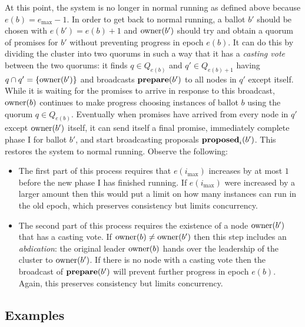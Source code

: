\documentclass[journal]{IEEEtran}
\begin{document}
At this point, the system is no longer in normal running as defined above
because $e(b) = e_\mathrm{max} - 1$. In order to get back to normal running, a
ballot $b'$ should be chosen with $e(b') = e(b) + 1$ and $\mathrm{owner}(b')$ should
try and obtain a quorum of promises for $b'$ without preventing progress in
epoch $e(b)$. It can do this by dividing the cluster into two quorums in such a
way that it has a \textit{casting vote} between the two quorums: it finds $q
\in Q_{e(b)}$ and $q' \in Q_{e(b)+1}$ having $q \cap q' = \{\mathrm{owner}(b')\}$ and
broadcasts $\mathbf{prepare}(b')$ to all nodes in $q'$ except itself. While it is waiting
for the promises to arrive in response to this broadcast, $\mathrm{owner}(b)$ continues
to make progress choosing instances of ballot $b$ using the quorum $q \in
Q_{e(b)}$.  Eventually when promises have arrived from every node in $q'$
except $\mathrm{owner}(b')$ itself, it can send itself a final promise, immediately
complete phase I for ballot $b'$, and start broadcasting proposals
$\mathbf{proposed}_{i}(b')$.  This restores the system to normal running. Observe the
following:
%
\begin{itemize}
%
\item The first part of this process requires that $e(i_\mathrm{max})$
increases by at most $1$ before the new phase I has finished running. If
$e(i_\mathrm{max})$ were increased by a larger amount then this would put a
limit on how many instances can run in the old epoch, which preserves
consistency but limits concurrency.
%
\item The second part of this process requires the existence of a node
$\mathrm{owner}(b')$ that has a casting vote. If $\mathrm{owner}(b) \ne \mathrm{owner}(b')$ then this
step includes an \textit{abdication}: the original leader $\mathrm{owner}(b)$ hands
over the leadership of the cluster to $\mathrm{owner}(b')$. If there is no node with a
casting vote then the broadcast of $\mathbf{prepare}(b')$ will prevent further progress in
epoch $e(b)$. Again, this preserves consistency but limits concurrency.
%
\end{itemize}

\subsection{Examples}\label{types-of-configuration-change}

\def\maj#1{\mathbf{maj}(#1)}
\end{document}
